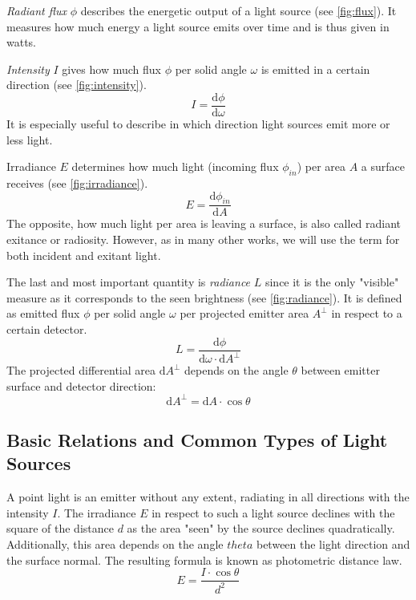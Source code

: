 \documentclass[thesis.tex]{subfiles}
\begin{document}
\emph{Radiant flux} $\phi$ describes the energetic output of a light source (see \autoref{fig:flux}).
It measures how much energy a light source emits over time and is thus given in watts.

\emph{Intensity} $I$ gives how much flux $\phi$ per solid angle $\omega$ is emitted in a certain direction (see \autoref{fig:intensity}).
\begin{equation}
I = \frac{\mathrm{d}\phi}{\mathrm{d}\omega}
\end{equation}
It is especially useful to describe in which direction light sources emit more or less light.

Irradiance $E$ determines how much light (incoming flux $\phi_{in}$) per area $A$ a surface receives (see \autoref{fig:irradiance}).
\begin{equation}
E = \frac{\mathrm{d}\phi_{in}}{\mathrm{d}A}
\end{equation}
The opposite, how much light per area is leaving a surface, is also called radiant exitance or radiosity.
However, as in many other works, we will use the term for both incident and exitant light.

The last and most important quantity is \emph{radiance} $L$ since it is the only "visible" measure as it corresponds to the seen brightness (see \autoref{fig:radiance}).
It is defined as emitted flux $\phi$ per solid angle $\omega$ per projected emitter area $A^\perp$ in respect to a certain detector.
\begin{equation}
L = \frac{\mathrm{d}\phi}{\mathrm{d}\omega \cdot \mathrm{d}A^\perp }
\end{equation}
The projected differential area $\mathrm{d}A^\perp$ depends on the angle $\theta$ between emitter surface and detector direction:
\begin{equation}
\mathrm{d}A^\perp = \mathrm{d}A \cdot \cos\theta
\end{equation}


\subsection{Basic Relations and Common Types of Light Sources} \label{sec:preq:theo:relation}
A point light is an emitter without any extent, radiating in all directions with the intensity $I$.
The irradiance  $E$ in respect to such a light source declines with the square of the distance $d$ as the area "seen" by the source declines quadratically.
Additionally, this area depends on the angle $theta$ between the light direction and the surface normal.
The resulting formula is known as photometric distance law.
\begin{equation}
E = \frac{I \cdot \cos\theta}{d^2}
\end{equation}
\end{document}

